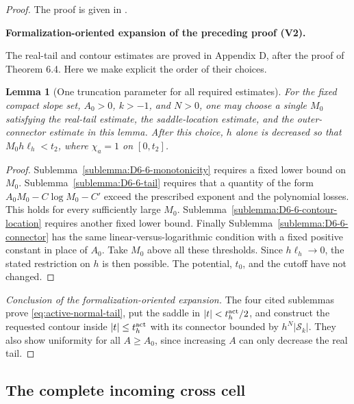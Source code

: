 \documentclass[11pt]{article}
\newtheorem{lemma}[theorem]{Lemma}
\newcommand{\formalisationparentid}{X}
\newenvironment{formalisationaddition}[1]{\par\medskip\begingroup\color{blue}\def\formalisationparentid{#1}\setcounter{formalizationsublemma}{0}\let\lemma\formalizationsublemma\let\endlemma\endformalizationsublemma
  \def\Eo{\mathcal E_h^\circ}\def\EE{\mathcal E_h}\def\phio{\phi_h^\circ}\def\phih{\phi_h}\def\Ho{H_h^{\rm atom}(v^\circ)}\def\Ha{H_h^{\rm atom}}\def\HL{H_h^{L}}\def\Dh{D_h}\def\Log{\operatorname{Log}}\def\ellh{\ell_h}\def\Gp{G_{p,h}}\def\Ast{A_{*,h}}\def\ahat{\widehat{\mathfrak a}_h}\def\ah{\mathfrak a_h}\def\rh{\widehat\rho_h}\def\deltah{\widehat\delta_h}\def\oldref##1{\textup{(##1)}}\def\interface##1{\par\noindent\textit{Analytical interface used here.} ##1\par}\def\finish{\par\noindent\textit{Conclusion of the formalization-oriented expansion.} }\par\noindent\textbf{Formalization-oriented expansion of the preceding proof (V2).}\par\smallskip
}{\par\endgroup\medskip
}
\begin{document}
\begin{proof}
The proof is given in .

\begin{formalisationaddition}{L6.6}
The real-tail and contour estimates are proved in Appendix D, after the proof of Theorem 6.4. Here we make explicit the order of their choices.

\begin{lemma}[One truncation parameter for all required estimates]\label{sublemma:L6-6-common-choice}
For the fixed compact slope set, $A_0>0$, $k>-1$, and $N>0$, one may choose a single $M_0$ satisfying the real-tail estimate, the saddle-location estimate, and the outer-connector estimate in this lemma. After this choice, $h$ alone is decreased so that $M_0h\ellh<t_2$, where $\chi_a=1$ on $[0,t_2]$.
\end{lemma}
\begin{proof}
Sublemma~\ref{sublemma:D6-6-monotonicity} requires a fixed lower bound on $M_0$. Sublemma~\ref{sublemma:D6-6-tail} requires that a quantity of the form $A_0M_0-C\log M_0-C'$ exceed the prescribed exponent and the polynomial losses. This holds for every sufficiently large $M_0$. Sublemma~\ref{sublemma:D6-6-contour-location} requires another fixed lower bound. Finally Sublemma~\ref{sublemma:D6-6-connector} has the same linear-versus-logarithmic condition with a fixed positive constant in place of $A_0$. Take $M_0$ above all these thresholds. Since $h\ellh\to0$, the stated restriction on $h$ is then possible. The potential, $t_0$, and the cutoff have not changed.
\end{proof}
\finish The four cited sublemmas prove \eqref{eq:active-normal-tail}, put the saddle in $|t|<t_h^{\rm act}/2$, and construct the requested contour inside $|t|\le t_h^{\rm act}$ with its connector bounded by $h^N|\mathcal S_k|$. They also show uniformity for all $A\ge A_0$, since increasing $A$ can only decrease the real tail.
\end{formalisationaddition}

\end{proof}

\subsection{The complete incoming cross cell}\label{sec:complete-incoming-cross}
\end{document}
